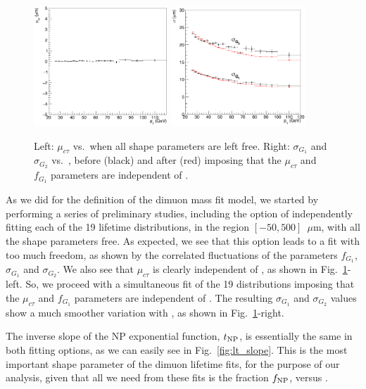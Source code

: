 \begin{figure}[b]
\centering
\includegraphics[width=0.45\textwidth]{Figures/chapter4/parf_mu.pdf}
\includegraphics[width=0.45\textwidth]{Figures/chapter4/parB_sig1.pdf}
\caption{Left: \jpsi $\mu_{c\tau}$ vs.\ \pt when all shape parameters are left free.
Right: \jpsi $\sigma_{G_1}$ and $\sigma_{G_2}$ vs.\ \pt, 
before (black) and after (red) imposing that 
the $\mu_{c\tau}$ and $f_{G_1}$ parameters are independent of \pt.}
\label{fig:lt_sigmas}
\end{figure}

As we did for the definition of the  dimuon mass fit model,
we started by performing a series of preliminary studies,
including the option of independently fitting 
each of the 19 lifetime distributions, 
in the region $[-50,500]$~$\mu$m, 
with all the shape parameters free.
As expected, we see that this option leads to a fit with too much freedom,
as shown by the correlated fluctuations of the parameters 
$f_{G_1}$, $\sigma_{G_1}$ and $\sigma_{G_2}$.
We also see that $\mu_{c\tau}$ is clearly independent of \pt,
as shown in Fig.~\ref{fig:lt_sigmas}-left.
So, we proceed with a simultaneous fit of the 19 distributions 
imposing that the $\mu_{c\tau}$ and $f_{G_1}$ parameters are
independent of \pt.
The resulting $\sigma_{G_1}$ and $\sigma_{G_2}$ values show a 
much smoother variation with \pt, as shown in Fig.~\ref{fig:lt_sigmas}-right.

\vfill\newpage

The inverse slope of the \jpsi NP exponential function, $t_{\rm NP}$,
is essentially the same in both fitting options, 
as we can easily see in Fig.~\ref{fig:lt_slope}.
This is the most important shape parameter of the dimuon lifetime fits,
for the purpose of our analysis, given that all we need from these fits is
the fraction $f_{\rm NP}$, versus \pt.

